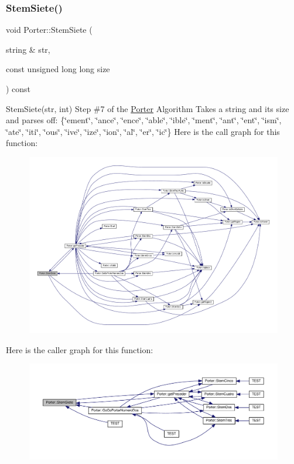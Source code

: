 \subsubsection{\texorpdfstring{Stem\+Siete()}{StemSiete()}}
{\footnotesize\ttfamily void Porter\+::\+Stem\+Siete (\begin{DoxyParamCaption}\item[{string \&}]{str,  }\item[{const unsigned long long}]{size }\end{DoxyParamCaption}) const}

Stem\+Siete(str, int) Step \#7 of the \hyperlink{class_porter}{Porter} Algorithm Takes a string and its size and parses off\+: \{\char`\"{}ement\char`\"{}, \char`\"{}ance\char`\"{}, \char`\"{}ence\char`\"{}, \char`\"{}able\char`\"{}, \char`\"{}ible\char`\"{}, \char`\"{}ment\char`\"{}, \char`\"{}ant\char`\"{}, \char`\"{}ent\char`\"{}, \char`\"{}ism\char`\"{}, \char`\"{}ate\char`\"{}, \char`\"{}iti\char`\"{}, \char`\"{}ous\char`\"{}, \char`\"{}ive\char`\"{}, \char`\"{}ize\char`\"{}, \char`\"{}ion\char`\"{}, \char`\"{}al\char`\"{}, \char`\"{}er\char`\"{}, \char`\"{}ic\char`\"{}\} Here is the call graph for this function\+:
\nopagebreak
\begin{figure}[H]
\begin{center}
\leavevmode
\includegraphics[width=350pt]{class_porter_a1015f959403c55d740fff435f0cae439_cgraph}
\end{center}
\end{figure}
Here is the caller graph for this function\+:
\nopagebreak
\begin{figure}[H]
\begin{center}
\leavevmode
\includegraphics[width=350pt]{class_porter_a1015f959403c55d740fff435f0cae439_icgraph}
\end{center}
\end{figure}
